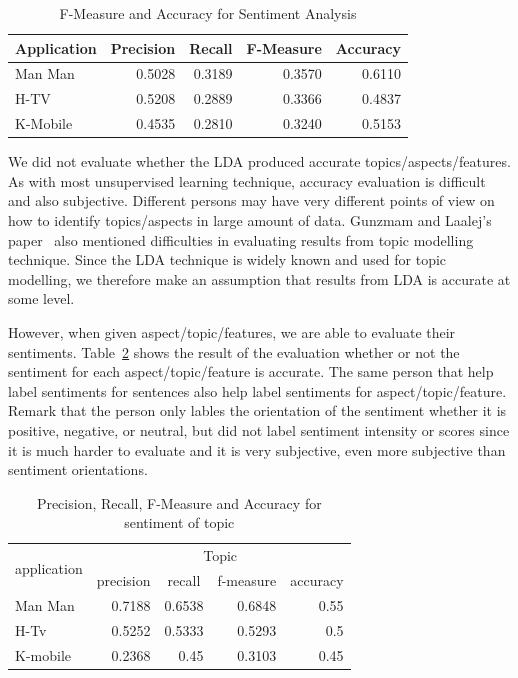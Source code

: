 \begin{table}[h]
	\caption{F-Measure and Accuracy for Sentiment Analysis}
	\label{table:f-measureSenti}
	\centering
	\begin{tabular}{|l|r|r|r|r|}
		\hline
		\multicolumn{1}{|c|}{\textbf{Application}} &
		\multicolumn{1}{|c|}{\textbf{Precision}} &
		\multicolumn{1}{|c|}{\textbf{Recall}} &
		\multicolumn{1}{|c|}{\textbf{F-Measure}} &
		\multicolumn{1}{|c|}{\textbf{Accuracy}} \\
		\hline
		Man Man & 0.5028 & 0.3189 & 0.3570 & 0.6110\\
		\hline
		H-TV & 0.5208 & 0.2889 & 0.3366 & 0.4837 \\
		\hline
		K-Mobile & 0.4535 & 0.2810 & 0.3240 & 0.5153 \\
		\hline
	\end{tabular}
\end{table}

We did not evaluate whether the LDA produced accurate topics/aspects/features. As with most unsupervised learning technique, accuracy evaluation is difficult and also subjective. Different persons may have very different points of view on how to identify topics/aspects in large amount of data. Gunzmam and Laalej's paper~\cite{userslikefeature} also mentioned difficulties in evaluating results from topic modelling technique. Since the LDA technique is widely known and used for topic modelling, we therefore make an assumption that results from LDA is accurate at some level. 

However, when given aspect/topic/features, we are able to evaluate their sentiments. Table~\ref{table:f-measureTopic} shows the result of the evaluation whether or not the sentiment for each aspect/topic/feature is accurate. The same person that help label sentiments for sentences also help label sentiments for aspect/topic/feature. Remark that the person only lables the orientation of the sentiment whether it is positive, negative, or neutral, but did not label sentiment intensity or scores since it is much harder to evaluate and it is very subjective, even more subjective than sentiment orientations.

\begin{table}
	\caption{Precision, Recall, F-Measure and Accuracy for sentiment of topic}
	\label{table:f-measureTopic}
	\centering
	\begin{tabular}{|l|r|r|r|r|}
		\hline
		\multicolumn{1}{|c|}{\multirow{2}{*}{application}} & 
		\multicolumn{4}{|c|}{Topic} \\
		\cline{2-5}
		\multicolumn{1}{|c|}{} &
		\multicolumn{1}{|c|}{precision}&
		\multicolumn{1}{|c|}{recall}&
		\multicolumn{1}{|c|}{f-measure} &
		\multicolumn{1}{|c|}{accuracy} \\
		\hline
		Man Man & 0.7188 & 0.6538 & 0.6848 & 0.55\\
		\hline
		H-Tv & 0.5252 & 0.5333 & 0.5293 & 0.5\\
		\hline
		K-mobile & 0.2368 & 0.45 & 0.3103 & 0.45\\
		\hline
	\end{tabular}
\end{table}

